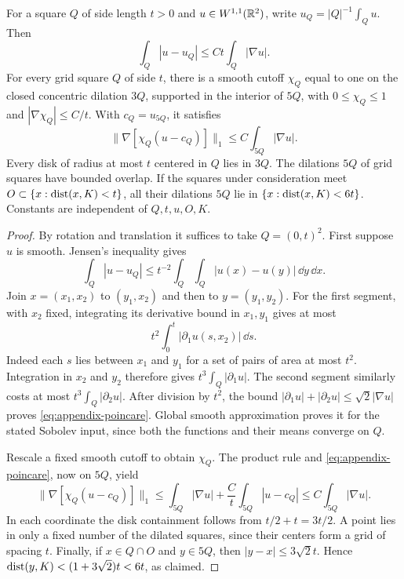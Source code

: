 \begin{lemma}\label{lem:appendix-square}
For a square $Q$ of side length $t>0$ and
$u\in W^{1,1}(\mathbb R^2)$, write $u_Q=|Q|^{-1}\int_Qu$. Then
\begin{equation}\label{eq:appendix-poincare}
 \int_Q|u-u_Q|\le Ct\int_Q|\nabla u|.
\end{equation}
For every grid square $Q$ of side $t$, there is a smooth cutoff
$\chi_Q$ equal to one on the closed concentric dilation $3Q$,
supported in the interior of $5Q$, with $0\le\chi_Q\le1$ and
$|\nabla\chi_Q|\le C/t$. With $c_Q=u_{5Q}$, it satisfies
\begin{equation}\label{eq:appendix-localization}
 \|\nabla[\chi_Q(u-c_Q)]\|_1
       \le C\int_{5Q}|\nabla u|.
\end{equation}
Every disk of radius at most $t$ centered in $Q$ lies in $3Q$.
The dilations $5Q$ of grid squares have bounded overlap. If the
squares under consideration meet
$O\subset\{x:\operatorname{dist}(x,K)<t\}$, all their dilations $5Q$ lie in
$\{x:\operatorname{dist}(x,K)<6t\}$. Constants are independent of
$Q,t,u,O,K$.
\end{lemma}

\begin{proof}
By rotation and translation it suffices to take $Q=(0,t)^2$.
First suppose $u$ is smooth. Jensen's inequality gives
\[
 \int_Q|u-u_Q|
 \le t^{-2}\int_Q\int_Q|u(x)-u(y)|\,\dd y\,\dd x.
\]
Join $x=(x_1,x_2)$ to $(y_1,x_2)$ and then to $y=(y_1,y_2)$.
For the first segment, with $x_2$ fixed, integrating its
derivative bound in $x_1,y_1$ gives at most
\[
 t^2\int_0^t|\partial_1u(s,x_2)|\,\dd s.
\]
Indeed each $s$ lies between $x_1$ and $y_1$ for a set of pairs
of area at most $t^2$. Integration in $x_2$ and $y_2$ therefore
gives $t^3\int_Q|\partial_1u|$. The second segment similarly
costs at most $t^3\int_Q|\partial_2u|$.
After division by $t^2$, the bound
$|\partial_1u|+|\partial_2u|\le\sqrt2|\nabla u|$ proves
\eqref{eq:appendix-poincare}. Global smooth approximation proves
it for the stated Sobolev input, since both the functions and
their means converge on $Q$.

Rescale a fixed smooth cutoff to obtain $\chi_Q$. The product
rule and \eqref{eq:appendix-poincare}, now on $5Q$, yield
\[
 \|\nabla[\chi_Q(u-c_Q)]\|_1
 \le\int_{5Q}|\nabla u|+\frac C t\int_{5Q}|u-c_Q|
 \le C\int_{5Q}|\nabla u|.
\]
In each coordinate the disk containment follows from
$t/2+t=3t/2$. A point lies in only a fixed number of the
dilated squares, since their centers form a grid of spacing $t$.
Finally, if $x\in Q\cap O$ and $y\in5Q$, then
$|y-x|\le3\sqrt2t$. Hence
$\operatorname{dist}(y,K)<(1+3\sqrt2)t<6t$, as claimed.
\end{proof}

